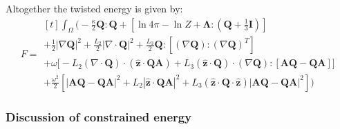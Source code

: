 \documentclass[reqno]{article}
\newcommand{\Q}{\mathbf{Q}}
\newcommand{\A}{\mathbf{A}}
\newcommand{\bLambda}{\boldsymbol{\Lambda}}
\newcommand{\z}{\mathbf{\hat{z}}}
\begin{document}
Altogether the twisted energy is given by:
\begin{equation}
    F
    =
    \begin{multlined}[t]
        \int_{\Omega} \biggl(
            -\frac{\kappa}{2} \Q : \Q
            + \left[ \ln 4 \pi - \ln Z + \bLambda : \left(\Q + \tfrac13 \mathbf I \right) \right] \\
            + \frac12 \left| \nabla \Q \right|^2 
            + \frac{L_2}{2} \left| \nabla \cdot \Q \right|^2
            + \frac{L_3}{2} \Q : \left[ \left( \nabla \Q \right) : \left( \nabla \Q \right)^T \right] \\
            + \omega \bigl[
                - L_2 \left( \nabla \cdot \Q \right) \cdot \left( \z \cdot \Q \A \right)
                + L_3 \left( \z \cdot \Q \right) \cdot \left( \nabla \Q \right) : \left[ \A \Q - \Q \A \right]
            \bigr] \\
            + \frac{\omega^2}{2} \left[
                \left| \A \Q - \Q \A \right|^2
                + L_2 \left| \z \cdot \Q \A \right|^2
                + L_3 \left( \z \cdot \Q \cdot \z \right) \left| \A \Q - \Q \A \right|^2
            \right]
        \biggr)
    \end{multlined}
\end{equation}

\subsubsection{Discussion of constrained energy}
\end{document}
